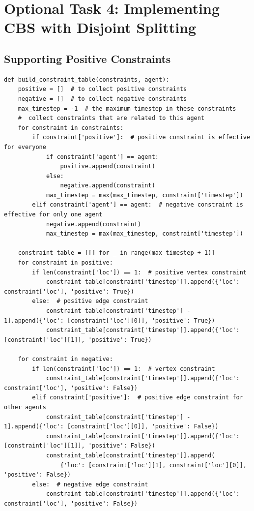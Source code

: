 \documentclass[11pt]{article}
\begin{document}
\section{Optional Task 4: Implementing CBS with Disjoint Splitting}

\subsection{Supporting Positive Constraints}

\begin{verbatim}
def build_constraint_table(constraints, agent):
    positive = []  # to collect positive constraints
    negative = []  # to collect negative constraints
    max_timestep = -1  # the maximum timestep in these constraints
    #  collect constraints that are related to this agent
    for constraint in constraints:
        if constraint['positive']:  # positive constraint is effective for everyone
            if constraint['agent'] == agent:
                positive.append(constraint)
            else:
                negative.append(constraint)
            max_timestep = max(max_timestep, constraint['timestep'])
        elif constraint['agent'] == agent:  # negative constraint is effective for only one agent
            negative.append(constraint)
            max_timestep = max(max_timestep, constraint['timestep'])

    constraint_table = [[] for _ in range(max_timestep + 1)]
    for constraint in positive:
        if len(constraint['loc']) == 1:  # positive vertex constraint
            constraint_table[constraint['timestep']].append({'loc': constraint['loc'], 'positive': True})
        else:  # positive edge constraint
            constraint_table[constraint['timestep'] - 1].append({'loc': [constraint['loc'][0]], 'positive': True})
            constraint_table[constraint['timestep']].append({'loc': [constraint['loc'][1]], 'positive': True})

    for constraint in negative:
        if len(constraint['loc']) == 1:  # vertex constraint
            constraint_table[constraint['timestep']].append({'loc': constraint['loc'], 'positive': False})
        elif constraint['positive']:  # positive edge constraint for other agents
            constraint_table[constraint['timestep'] - 1].append({'loc': [constraint['loc'][0]], 'positive': False})
            constraint_table[constraint['timestep']].append({'loc': [constraint['loc'][1]], 'positive': False})
            constraint_table[constraint['timestep']].append(
                {'loc': [constraint['loc'][1], constraint['loc'][0]], 'positive': False})
        else:  # negative edge constraint
            constraint_table[constraint['timestep']].append({'loc': constraint['loc'], 'positive': False})


\end{verbatim}
\end{document}
